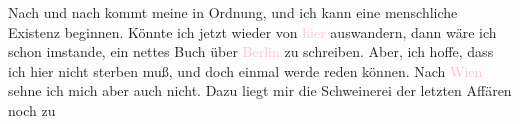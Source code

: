 \pstart
           Nach und nach kommt meine \label{K_L03415-5v}\label{K_L03415-5h} in Ordnung, und ich kann eine menschliche Existenz beginnen. Könnte ich jetzt
               wieder von \textcolor{pink}{hier}{}\ledrightnote{{$\rightarrow$}\textcolor{pink}{Berlin}} auswandern,
               dann wäre ich schon imstande, ein nettes Buch über \textcolor{pink}{Berlin}{}\ledrightnote{\textcolor{pink}{Berlin}} zu schreiben. Aber, ich hoffe, dass ich hier nicht sterben muß, und
               doch einmal werde reden können. Nach \textcolor{pink}{Wien}{}\ledrightnote{\textcolor{pink}{Wien}} sehne
               ich mich aber auch nicht. Dazu liegt mir die Schweinerei der letzten Affären noch zu
